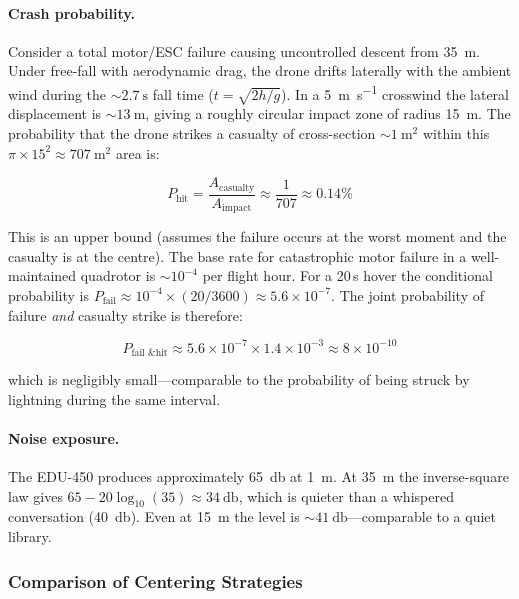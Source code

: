\paragraph{Crash probability.}
Consider a total motor/ESC failure causing uncontrolled descent from \SI{35}{\metre}. Under free-fall with aerodynamic drag, the drone drifts laterally with the ambient wind during the ${\sim}\SI{2.7}{\second}$ fall time ($t = \sqrt{2h/g}$). In a \SI{5}{\metre\per\second} crosswind the lateral displacement is ${\sim}\SI{13}{\metre}$, giving a roughly circular impact zone of radius \SI{15}{\metre}. The probability that the drone strikes a casualty of cross-section ${\sim}\SI{1}{\metre\squared}$ within this $\pi \times 15^2 \approx \SI{707}{\metre\squared}$ area is:

\begin{equation}
    P_{\text{hit}} = \frac{A_{\text{casualty}}}{A_{\text{impact}}} \approx \frac{1}{707} \approx 0.14\%
\end{equation}

\noindent This is an upper bound (assumes the failure occurs at the worst moment and the casualty is at the centre). The base rate for catastrophic motor failure in a well-maintained quadrotor is ${\sim}10^{-4}$ per flight hour. For a 20\,s hover the conditional probability is $P_{\text{fail}} \approx 10^{-4} \times (20/3600) \approx 5.6 \times 10^{-7}$. The joint probability of failure \emph{and} casualty strike is therefore:

\begin{equation}
    P_{\text{fail \& hit}} \approx 5.6 \times 10^{-7} \times 1.4 \times 10^{-3} \approx 8 \times 10^{-10}
\end{equation}

\noindent which is negligibly small---comparable to the probability of being struck by lightning during the same interval.

\paragraph{Noise exposure.}
The EDU-450 produces approximately \SI{65}{\decibel} at \SI{1}{\metre}. At \SI{35}{\metre} the inverse-square law gives $65 - 20\log_{10}(35) \approx \SI{34}{\decibel}$, which is quieter than a whispered conversation (\SI{40}{\decibel}). Even at \SI{15}{\metre} the level is ${\sim}\SI{41}{\decibel}$---comparable to a quiet library.

\subsubsection{Comparison of Centering Strategies}

